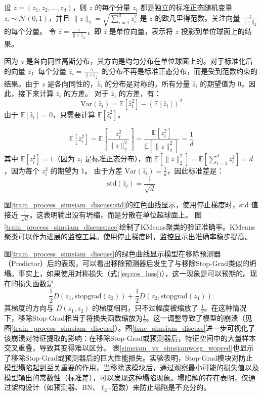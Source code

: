 \documentclass[master]{thesis-uestc}
\begin{document}
    设 \( z = (z_1, z_2, \dots, z_d) \)，则 \( z \) 的每个分量 \( z_i \) 都是独立的标准正态随机变量 \( z_i \sim \mathcal{N}(0, 1) \)，并且 \( \|z\|_2 = \sqrt{\sum_{i=1}^{d} z_i^2} \) 是 \( z \) 的欧几里得范数。关注向量 \( \frac{z}{\|z\|_2} \) 的每个分量。
    令 \( \hat{z} = \frac{z}{\|z\|_2} \)，即 \( \hat{z} \) 是单位向量，表示将 \( z \) 投影到单位球面上的结果。

    因为 \( z \) 是各向同性高斯分布，其方向是均匀分布在单位球面上的。对于标准化后的向量 \( \hat{z} \)，每个分量 \( \hat{z}_i = \frac{z_i}{\|z\|_2} \) 的分布不再是标准正态分布，而是受到范数约束的结果。由于 \( z \) 是各向同性的，\( \hat{z}_i \) 的分布是对称的，所有分量 \( \hat{z}_i \) 的期望值为 0。因此，接下来计算 \( \hat{z}_i \) 的方差。
    对于 \( \hat{z}_i \) 的方差，有：
    \begin{equation}
    \text{Var}(\hat{z}_i) = \mathbb{E}[\hat{z}_i^2] - (\mathbb{E}[\hat{z}_i])^2
    \end{equation}
    由于 \( \mathbb{E}[\hat{z}_i] = 0 \)，只需要计算 \( \mathbb{E}[\hat{z}_i^2] \)。

    \begin{equation}
    \mathbb{E}[\hat{z}_i^2] = \mathbb{E}\left[\frac{z_i^2}{\|z\|_2^2}\right] = \frac{\mathbb{E}[z_i^2]}{\mathbb{E}[\|z\|_2^2]} = \frac{1}{d}
    \end{equation}
    其中 \( \mathbb{E}[z_i^2] = 1 \)（因为 \( z_i \) 是标准正态分布），而 \( \mathbb{E}[\|z\|_2^2] = \mathbb{E}[\sum_{i=1}^{d} z_i^2] = d \)，因为每个 \( z_i^2 \) 的期望为 1。
    由于方差 \( \text{Var}(\hat{z}_i) = \frac{1}{d} \)，因此标准差是：
    \begin{equation}
    \text{std}(\hat{z}_i) = \frac{1}{\sqrt{d}}
    \end{equation}


图\ref{train_process_simsiam_discuss:std}的红色曲线显示，使用停止梯度时，std 值接近 \( \frac{1}{\sqrt{d}} \)。这表明输出没有坍缩，而是分散在单位超球面上。
图\ref{train_process_simsiam_discuss:acc}绘制了KMeans聚类的验证准确率。KMeans聚类可以作为进展的监控工具。使用停止梯度时，监控显示出准确率稳步提高。

图\ref{train_process_simsiam_discuss}的绿色曲线显示模型在移除预测器（Predictor）后的表现，可以看出移除预测器后发生了与移除Stop-Grad类似的坍塌。事实上，如果使用对称损失（式(\ref{eq:cos_loss})），这一现象是可以预期的。现在的损失函数是
\begin{equation}
    \frac{1}{2}D(z_1, \text{stopgrad}(z_2)) + \frac{1}{2}D(z_2, \text{stopgrad}(z_1)).
\end{equation}
其梯度的方向与 $D(z_1, z_2)$ 的梯度相同，只不过幅度被缩放了 $\frac{1}{2}$。在这种情况下，移除Stop-Grad相当于将损失函数缩放为$\frac{1}{2}$。这一调整导致了模型的崩溃（见图\ref{train_process_simsiam_discuss}）。图\ref{tsne_simsiam_discuss}进一步可视化了该崩溃对特征提取的影响：在移除Stop-Grad或预测器后，特征空间中的大量样本交叉重叠，导致其变得难以区分。
表\ref{simsiam_vs_simsiamwosg_wopred}也显示了移除Stop-Grad或预测器后的巨大性能损失。实验表明，Stop-Grad模块对防止模型塌陷起到至关重要的作用，当移除该模块后，通过观察最小可能的损失值以及模型输出的常数性（标准差），可以发现这种塌陷现象。塌陷解的存在表明，仅通过架构设计（如预测器、BN、$\ell_{2}$-范数）来防止塌陷是不充分的。
\end{document}
